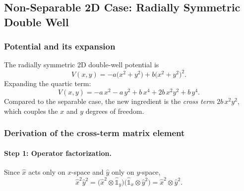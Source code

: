 \subsection{Non-Separable 2D Case: Radially Symmetric Double
Well}\label{sec:radial_2d}

\subsubsection{Potential and its expansion}

The radially symmetric 2D double-well potential is
\begin{equation}\label{eq:V_radial_2d}
    V(x,y) = -a\bigl(x^2 + y^2\bigr) + b\bigl(x^2 + y^2\bigr)^2.
\end{equation}
Expanding the quartic term:
\begin{equation}\label{eq:V_radial_2d_expand}
    V(x,y) = -a\,x^2 - a\,y^2 + b\,x^4 + 2b\,x^2 y^2 + b\,y^4.
\end{equation}
Compared to the separable case, the new ingredient is the \emph{cross term}
$2b\,x^2 y^2$, which couples the $x$ and $y$ degrees of freedom.

\subsubsection{Derivation of the cross-term matrix element}

\paragraph{Step 1: Operator factorization.}
Since $\hat{x}$ acts only on $x$-space and $\hat{y}$ only on $y$-space,
\begin{equation}\label{eq:x2y2_factor_op}
    \hat{x}^2\hat{y}^2
    = \bigl(\hat{x}^2 \otimes \hat{\mathbb{1}}_y\bigr)
    \bigl(\hat{\mathbb{1}}_x \otimes \hat{y}^2\bigr)
    = \hat{x}^2 \otimes \hat{y}^2.
\end{equation}

